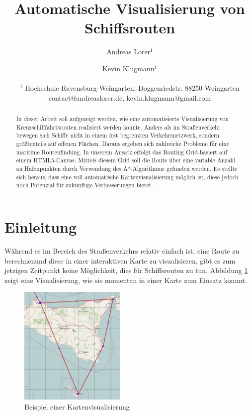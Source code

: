 \documentclass[letterpaper]{article}
\title{Automatische Visualisierung von Schiffsrouten}
\author{Andreas Lorer$^{1}$ \and  Kevin Klugmann$^{1}$\\
\mbox{}\\
$^{1}$ Hochschule Ravensburg-Weingarten, Doggenriedstr. 88250 Weingarten \\
contact@andreaslorer.de, kevin.klugmann@gmail.com}
\begin{document}
\maketitle

\begin{abstract}
	In dieser Arbeit soll aufgezeigt werden, wie eine automatisierte Visualisierung von Kreuzschifffahrtsrouten realisiert werden konnte.
	Anders als im Straßenverkehr bewegen sich Schiffe nicht in einem fest begrenzten Verkehrsnetzwerk, sondern größtenteils auf offenen Flächen. Daraus ergeben sich zahlreiche Probleme für eine maritime Routenfindung. In unserem Ansatz erfolgt das Routing Grid-basiert auf einem HTML5-Canvas. Mittels diesem Grid soll die Route über eine variable Anzahl an Hafenpunkten durch Verwendung des A*-Algorithmus gefunden werden. Es stellte sich heraus, dass eine voll automatische Kartenvisualisierung möglich ist, diese jedoch noch Potenzial für zukünftige Verbesserungen bietet.
\end{abstract}

\section{Einleitung}
	Während es im Bereich des Straßenverkehrs relativ einfach ist, eine Route zu berechnen\footnotemark und diese in einer interaktiven Karte zu visualisieren, gibt es zum jetzigen Zeitpunkt keine Möglichkeit, dies für Schiffsrouten zu tun. Abbildung \ref{fig:visualisierungsproblem} zeigt eine Visualisierung, wie sie momentan in einer Karte zum Einsatz kommt. 


	\begin{figure}[!htb]
		\begin{center}
		\includegraphics[width=2in]{visualisierungsproblem}
		\caption{Beispiel einer Kartenvisualisierung}
		\label{fig:visualisierungsproblem}
		\end{center}
	\end{figure}
\end{document}

